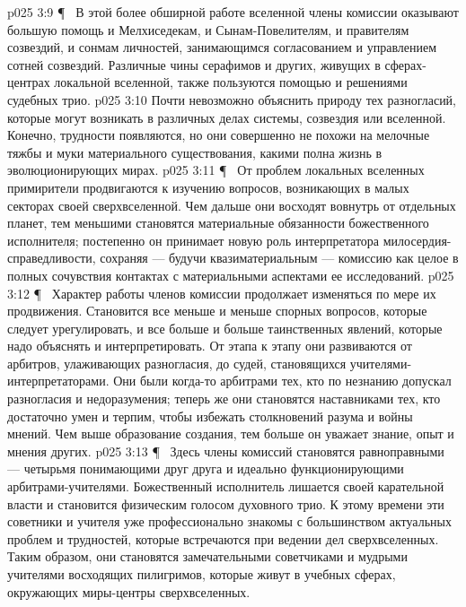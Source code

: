 \vs p025 3:9 \P\ \bibnobreakspace {} В этой более обширной работе вселенной члены комиссии оказывают большую помощь и Мелхиседекам, и Сынам\hyp{}Повелителям, и правителям созвездий, и сонмам личностей, занимающимся согласованием и управлением сотней созвездий. Различные чины серафимов и других, живущих в сферах\hyp{}центрах локальной вселенной, также пользуются помощью и решениями судебных трио.
\vs p025 3:10 Почти невозможно объяснить природу тех разногласий, которые могут возникать в различных делах системы, созвездия или вселенной. Конечно, трудности появляются, но они совершенно не похожи на мелочные тяжбы и муки материального существования, какими полна жизнь в эволюционирующих мирах.
\vs p025 3:11 \P\ \bibnobreakspace {} От проблем локальных вселенных примирители продвигаются к изучению вопросов, возникающих в малых секторах своей сверхвселенной. Чем дальше они восходят вовнутрь от отдельных планет, тем меньшими становятся материальные обязанности божественного исполнителя; постепенно он принимает новую роль интерпретатора милосердия\hyp{}справедливости, сохраняя --- будучи квазиматериальным --- комиссию как целое в полных сочувствия контактах с материальными аспектами ее исследований.
\vs p025 3:12 \P\ \bibnobreakspace {} Характер работы членов комиссии продолжает изменяться по мере их продвижения. Становится все меньше и меньше спорных вопросов, которые следует урегулировать, и все больше и больше таинственных явлений, которые надо объяснять и интерпретировать. От этапа к этапу они развиваются от арбитров, улаживающих разногласия, до  судей, становящихся учителями\hyp{}интерпретаторами. Они были когда\hyp{}то арбитрами тех, кто по незнанию допускал разногласия и недоразумения; теперь же они становятся наставниками тех, кто достаточно умен и терпим, чтобы избежать столкновений разума и войны мнений. Чем выше образование создания, тем больше он уважает знание, опыт и мнения других.
\vs p025 3:13 \P\ \bibnobreakspace {} Здесь члены комиссий становятся равноправными --- четырьмя понимающими друг друга и идеально функционирующими арбитрами\hyp{}учителями. Божественный исполнитель лишается своей карательной власти и становится физическим голосом духовного трио. К этому времени эти советники и учителя уже профессионально знакомы с большинством актуальных проблем и трудностей, которые встречаются при ведении дел сверхвселенных. Таким образом, они становятся замечательными советчиками и мудрыми учителями восходящих пилигримов, которые живут в учебных сферах, окружающих миры\hyp{}центры сверхвселенных.
